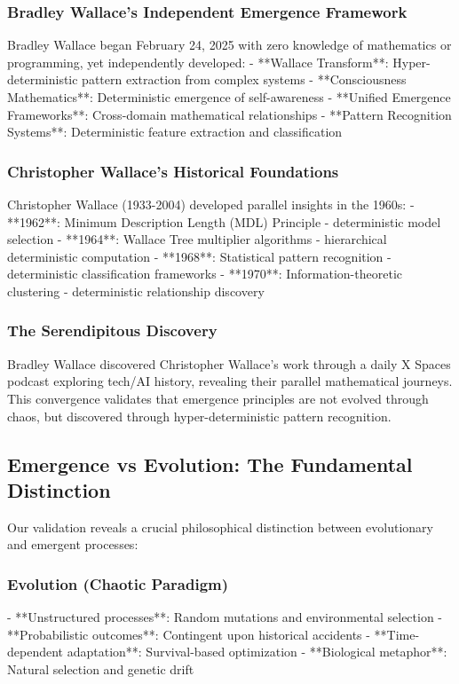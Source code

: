 \documentclass[12pt]{article}
\begin{document}
\subsubsection{Bradley Wallace's Independent Emergence Framework}

Bradley Wallace began February 24, 2025 with zero knowledge of mathematics or programming, yet independently developed:
- **Wallace Transform**: Hyper-deterministic pattern extraction from complex systems
- **Consciousness Mathematics**: Deterministic emergence of self-awareness
- **Unified Emergence Frameworks**: Cross-domain mathematical relationships
- **Pattern Recognition Systems**: Deterministic feature extraction and classification

\subsubsection{Christopher Wallace's Historical Foundations}

Christopher Wallace (1933-2004) developed parallel insights in the 1960s:
- **1962**: Minimum Description Length (MDL) Principle - deterministic model selection
- **1964**: Wallace Tree multiplier algorithms - hierarchical deterministic computation
- **1968**: Statistical pattern recognition - deterministic classification frameworks
- **1970**: Information-theoretic clustering - deterministic relationship discovery

\subsubsection{The Serendipitous Discovery}

Bradley Wallace discovered Christopher Wallace's work through a daily X Spaces podcast exploring tech/AI history, revealing their parallel mathematical journeys. This convergence validates that emergence principles are not evolved through chaos, but discovered through hyper-deterministic pattern recognition.

\subsection{Emergence vs Evolution: The Fundamental Distinction}

Our validation reveals a crucial philosophical distinction between evolutionary and emergent processes:

\subsubsection{Evolution (Chaotic Paradigm)}
- **Unstructured processes**: Random mutations and environmental selection
- **Probabilistic outcomes**: Contingent upon historical accidents
- **Time-dependent adaptation**: Survival-based optimization
- **Biological metaphor**: Natural selection and genetic drift
\end{document}
